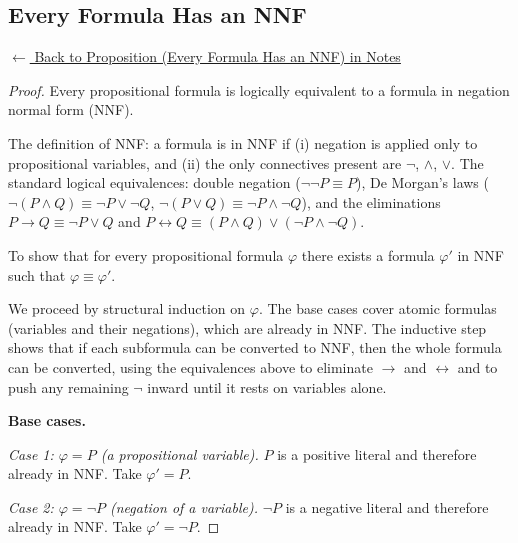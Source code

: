 
\subsection*{Every Formula Has an NNF}
\label{prf:nnf-exists}

\begin{remark*}[Return]
\hyperref[prop:nnf-exists]{$\leftarrow$ Back to Proposition (Every Formula Has an NNF) in Notes}
\end{remark*}

\begin{proof}
\Claim Every propositional formula is logically equivalent to a formula in negation normal form (NNF).

\Given The definition of NNF: a formula is in NNF if (i) negation is applied
only to propositional variables, and (ii) the only connectives present are
$\neg$, $\wedge$, $\vee$. The standard logical equivalences: double negation
($\neg\neg P \equiv P$), De Morgan's laws ($\neg(P \wedge Q) \equiv \neg P
\vee \neg Q$, $\neg(P \vee Q) \equiv \neg P \wedge \neg Q$), and the
eliminations $P \rightarrow Q \equiv \neg P \vee Q$ and $P \leftrightarrow Q
\equiv (P \wedge Q) \vee (\neg P \wedge \neg Q)$.

\Goal To show that for every propositional formula $\varphi$ there exists a
formula $\varphi'$ in NNF such that $\varphi \equiv \varphi'$.

\Strategy We proceed by structural induction on $\varphi$. The base cases
cover atomic formulas (variables and their negations), which are already in
NNF. The inductive step shows that if each subformula can be converted to NNF,
then the whole formula can be converted, using the equivalences above to
eliminate $\rightarrow$ and $\leftrightarrow$ and to push any remaining
$\neg$ inward until it rests on variables alone.

\medskip
\noindent\textbf{Base cases.}

\medskip
\textit{Case 1: $\varphi = P$ (a propositional variable).}
$P$ is a positive literal and therefore already in NNF. Take $\varphi' = P$.

\medskip
\textit{Case 2: $\varphi = \neg P$ (negation of a variable).}
$\neg P$ is a negative literal and therefore already in NNF. Take $\varphi' = \neg P$.


\end{proof}
